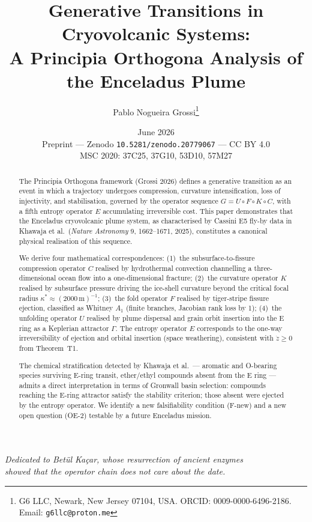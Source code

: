 \documentclass[12pt]{article}
\title{\textbf{Generative Transitions in Cryovolcanic Systems:}\\[0.4em]
\large A Principia Orthogona Analysis of the Enceladus Plume}
\author{Pablo Nogueira Grossi\thanks{%
  G6 LLC, Newark, New Jersey 07104, USA\@.
  ORCID: 0009-0000-6496-2186\@.
  Email: \texttt{g6llc@proton.me}}}
\date{June 2026\\[0.4em]
\small Preprint --- Zenodo \texttt{10.5281/zenodo.20779067} --- CC BY 4.0\\
MSC 2020: 37C25, 37G10, 53D10, 57M27}
\numberwithin{equation}{section}
\theoremstyle{remark}
\begin{document}
\maketitle

\begin{center}
\emph{Dedicated to Betül Kaçar, whose resurrection of ancient enzymes\\
showed that the operator chain does not care about the date.}
\end{center}

\vspace{1em}

\begin{abstract}
The Principia Orthogona framework (Grossi 2026) defines a generative transition
as an event in which a trajectory undergoes compression, curvature intensification,
loss of injectivity, and stabilisation, governed by the operator sequence
$G = U \circ F \circ K \circ C$, with a fifth entropy operator $E$ accumulating
irreversible cost. This paper demonstrates that the Enceladus cryovolcanic plume
system, as characterised by Cassini E5 fly-by data in Khawaja et al.\
(\emph{Nature Astronomy} 9, 1662--1671, 2025), constitutes a canonical physical
realisation of this sequence.

We derive four mathematical correspondences: (1)~the subsurface-to-fissure
compression operator $C$ realised by hydrothermal convection channelling a
three-dimensional ocean flow into a one-dimensional fracture;
(2)~the curvature operator $K$ realised by subsurface pressure driving the
ice-shell curvature beyond the critical focal radius
$\kappa^* \approx (2000\,\mathrm{m})^{-1}$;
(3)~the fold operator $F$ realised by tiger-stripe fissure ejection, classified
as Whitney $A_1$ (finite branches, Jacobian rank loss by 1);
(4)~the unfolding operator $U$ realised by plume dispersal and grain orbit
insertion into the E ring as a Keplerian attractor $\Gamma$.
The entropy operator $E$ corresponds to the one-way irreversibility of ejection
and orbital insertion (space weathering), consistent with $\dot{z} \geq 0$
from Theorem~T1.

The chemical stratification detected by Khawaja et al.\ --- aromatic and
O-bearing species surviving E-ring transit, ether/ethyl compounds absent from
the E ring --- admits a direct interpretation in terms of Gronwall basin
selection: compounds reaching the E-ring attractor satisfy the stability
criterion; those absent were ejected by the entropy operator. We identify a new
falsifiability condition (F-new) and a new open question (OE-2) testable by a
future Enceladus mission.
\end{abstract}
\end{document}
